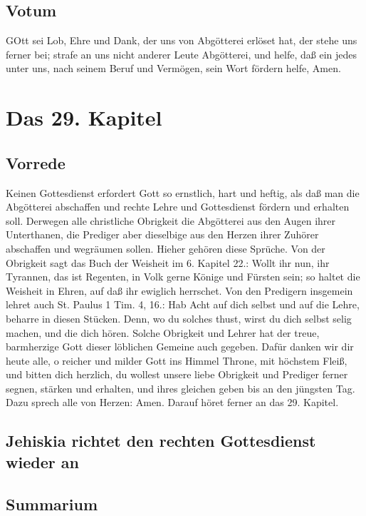 \section{Votum}

GOtt sei Lob, Ehre und Dank, der uns von Abgötterei erlöset hat, der stehe uns ferner bei; strafe an uns nicht anderer Leute Abgötterei, und helfe, daß ein jedes unter uns, nach seinem Beruf und Vermögen, sein Wort fördern helfe, Amen.

\chapter{Das 29. Kapitel}

\section{Vorrede}

Keinen Gottesdienst erfordert Gott so ernstlich, hart und heftig, als daß man die Abgötterei abschaffen und rechte Lehre und Gottesdienst fördern und erhalten soll. Derwegen alle christliche Obrigkeit die Abgötterei aus den Augen ihrer Unterthanen, die Prediger aber dieselbige aus den Herzen ihrer Zuhörer abschaffen und wegräumen sollen. Hieher gehören diese Sprüche. Von der Obrigkeit sagt das Buch der Weisheit im 6. Kapitel 22.: Wollt ihr nun, ihr Tyrannen, das ist Regenten, in Volk gerne Könige und Fürsten sein; so haltet die Weisheit in Ehren, auf daß ihr ewiglich herrschet. Von den Predigern insgemein lehret auch St. Paulus 1 Tim. 4, 16.: Hab Acht auf dich selbst und auf die Lehre, beharre in diesen Stücken. Denn, wo du solches thust, wirst du dich selbst selig machen, und die dich hören. Solche Obrigkeit und Lehrer hat der treue, barmherzige Gott dieser löblichen Gemeine auch gegeben. Dafür danken wir dir heute alle, o reicher und milder Gott ins Himmel Throne, mit höchstem Fleiß, und bitten dich herzlich, du wollest unsere liebe Obrigkeit und Prediger ferner segnen, stärken und erhalten, und ihres gleichen geben bis an den jüngsten Tag. Dazu sprech alle von Herzen: Amen. Darauf höret ferner an das 29. Kapitel.

\section[Jehiskia richtet den rechten Gottesdienst wieder an]{Jehiskia richtet den rechten Gottesdienst wieder an}

\section{Summarium}

